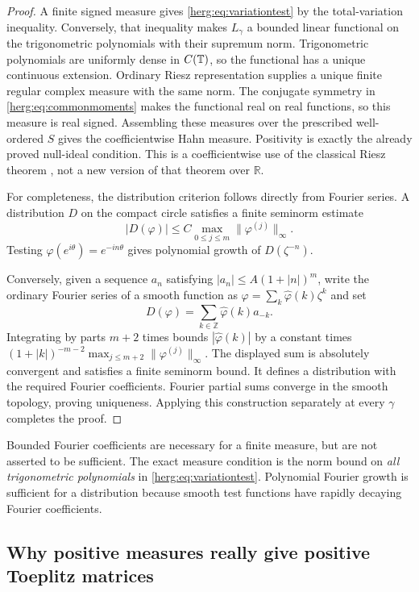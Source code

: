 \documentclass[11pt,letterpaper]{article}
\theoremstyle{definition}
\newcommand{\R}{\mathbb R}\newcommand{\C}{\mathbb C}
\newcommand{\Z}{\mathbb Z}\newcommand{\N}{\mathbb N}
\numberwithin{equation}{section}
\begin{document}
\begin{proof}
A finite signed measure gives \eqref{herg:eq:variationtest} by the total-variation inequality. Conversely, that inequality makes $L_\gamma$ a bounded linear functional on the trigonometric polynomials with their supremum norm. Trigonometric polynomials are uniformly dense in $C(\mathbb T)$, so the functional has a unique continuous extension. Ordinary Riesz representation supplies a unique finite regular complex measure with the same norm. The conjugate symmetry in \eqref{herg:eq:commonmoments} makes the functional real on real functions, so this measure is real signed. Assembling these measures over the prescribed well-ordered $S$ gives the coefficientwise Hahn measure. Positivity is exactly the already proved null-ideal condition. This is a coefficientwise use of the classical Riesz theorem \cite{Rudin}, not a new version of that theorem over $\R$.

For completeness, the distribution criterion follows directly from Fourier series. A distribution $D$ on the compact circle satisfies a finite seminorm estimate
\[
 |D(\varphi)|\le C\max_{0\le j\le m}\|\varphi^{(j)}\|_\infty.
\]
Testing $\varphi(e^{i\theta})=e^{-in\theta}$ gives polynomial growth of $D(\zeta^{-n})$.

Conversely, given a sequence $a_n$ satisfying $|a_n|\le A(1+|n|)^m$, write the ordinary Fourier series of a smooth function as $\varphi=\sum_k\widehat\varphi(k)\zeta^k$ and set
\[
 D(\varphi)=\sum_{k\in\Z}\widehat\varphi(k)a_{-k}.
\]
Integrating by parts $m+2$ times bounds $|\widehat\varphi(k)|$ by a constant times $(1+|k|)^{-m-2}\max_{j\le m+2}\|\varphi^{(j)}\|_\infty$. The displayed sum is absolutely convergent and satisfies a finite seminorm bound. It defines a distribution with the required Fourier coefficients. Fourier partial sums converge in the smooth topology, proving uniqueness. Applying this construction separately at every $\gamma$ completes the proof.
\end{proof}

Bounded Fourier coefficients are necessary for a finite measure, but are not asserted to be sufficient. The exact measure condition is the norm bound on \emph{all trigonometric polynomials} in \eqref{herg:eq:variationtest}. Polynomial Fourier growth is sufficient for a distribution because smooth test functions have rapidly decaying Fourier coefficients.

\subsection{Why positive measures really give positive Toeplitz matrices}
\end{document}
